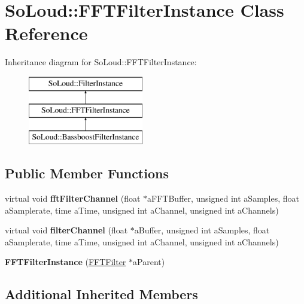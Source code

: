 \hypertarget{class_so_loud_1_1_f_f_t_filter_instance}{}\section{So\+Loud\+::F\+F\+T\+Filter\+Instance Class Reference}
\label{class_so_loud_1_1_f_f_t_filter_instance}
Inheritance diagram for So\+Loud\+::F\+F\+T\+Filter\+Instance\+:\begin{figure}[H]
\begin{center}
\leavevmode
\includegraphics[height=3.000000cm]{class_so_loud_1_1_f_f_t_filter_instance}
\end{center}
\end{figure}
\subsection*{Public Member Functions}
\begin{DoxyCompactItemize}
\item 
\mbox{\label{class_so_loud_1_1_f_f_t_filter_instance_ad27f06358dc73cc5e0b785fead35297a}} 
virtual void {\bfseries fft\+Filter\+Channel} (float $\ast$a\+F\+F\+T\+Buffer, unsigned int a\+Samples, float a\+Samplerate, time a\+Time, unsigned int a\+Channel, unsigned int a\+Channels)
\item 
\mbox{\label{class_so_loud_1_1_f_f_t_filter_instance_a600ad64b44ecf0036ac946310899b17a}} 
virtual void {\bfseries filter\+Channel} (float $\ast$a\+Buffer, unsigned int a\+Samples, float a\+Samplerate, time a\+Time, unsigned int a\+Channel, unsigned int a\+Channels)
\item 
\mbox{\label{class_so_loud_1_1_f_f_t_filter_instance_a00e5d27d93741b35910581ef36c003fa}} 
{\bfseries F\+F\+T\+Filter\+Instance} (\mbox{\hyperlink{class_so_loud_1_1_f_f_t_filter}{F\+F\+T\+Filter}} $\ast$a\+Parent)
\end{DoxyCompactItemize}
\subsection*{Additional Inherited Members}


